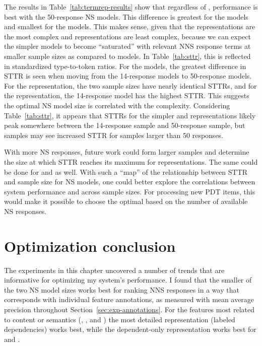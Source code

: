 The results in Table~\ref{tab:termrep-results} show that regardless of , performance is best with the 50-response NS models. This difference is greatest for the  models and smallest for the  models. This makes sense, given that the  representations are the most complex and  representations are least complex, because we can expect the simpler  models to become ``saturated'' with relevant NNS response terms at smaller sample sizes as compared to  models. In Table~\ref{tab:sttr}, this is reflected in standardized type-to-token ratios. For the  models, the greatest difference in STTR is seen when moving from the  14-response models to 50-response models. For the  representation, the two sample sizes have nearly identical STTRs, and for the  representation, the 14-response model has the highest STTR. This suggests the optimal NS model size is correlated with the complexity. Considering Table~\ref{tab:sttr}, it appears that STTRs for the simpler  and   representations likely peak somewhere between the 14-response sample and 50-response sample, but  samples may see increased STTR for samples larger than 50 responses.

With more NS responses, future work could form larger samples and determine the size at which STTR reaches its maximum for  representations. The same could be done for  and   as well. With such a ``map'' of the relationship between STTR and sample size for NS models, one could better explore the correlations between system performance and  across sample sizes. For processing new PDT items, this would make it possible to choose the optimal  based on the number of available NS responses.



\section{Optimization conclusion}
\label{sec:optimization-conclusion}
The experiments in this chapter uncovered a number of trends that are informative for optimizing my system's performance. I found that the smaller of the two NS model sizes works best for ranking NNS responses in a way that corresponds with individual feature annotations, as measured with mean average precision throughout Section~\ref{sec:exp-annotations}. For the features most related to content or semantics (, , and ) the most detailed representation (labeled dependencies) works best, while the dependent-only representation works best for  and .

